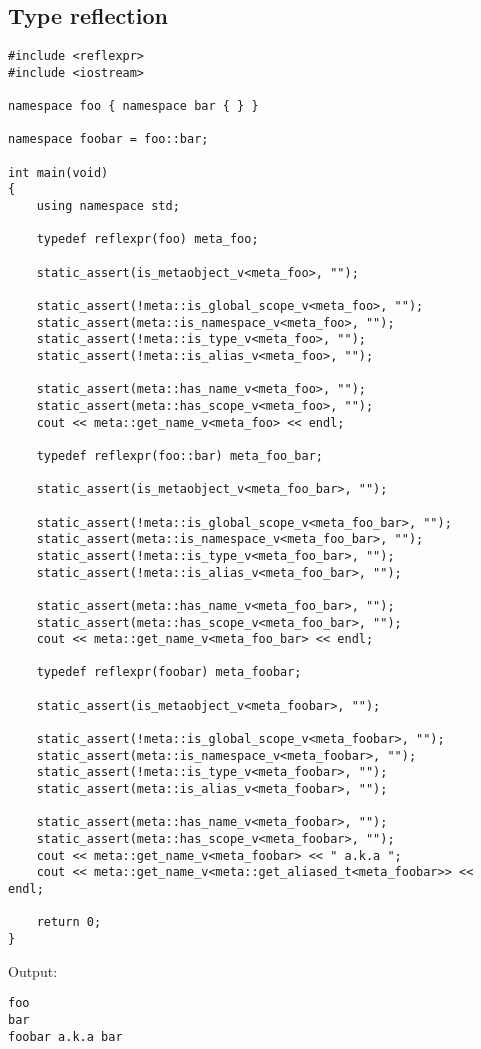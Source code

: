 \subsection{Type reflection}

\begin{verbatim}
#include <reflexpr>
#include <iostream>

namespace foo { namespace bar { } }

namespace foobar = foo::bar;

int main(void)
{
	using namespace std;

	typedef reflexpr(foo) meta_foo;

	static_assert(is_metaobject_v<meta_foo>, "");

	static_assert(!meta::is_global_scope_v<meta_foo>, "");
	static_assert(meta::is_namespace_v<meta_foo>, "");
	static_assert(!meta::is_type_v<meta_foo>, "");
	static_assert(!meta::is_alias_v<meta_foo>, "");

	static_assert(meta::has_name_v<meta_foo>, "");
	static_assert(meta::has_scope_v<meta_foo>, "");
	cout << meta::get_name_v<meta_foo> << endl;

	typedef reflexpr(foo::bar) meta_foo_bar;

	static_assert(is_metaobject_v<meta_foo_bar>, "");

	static_assert(!meta::is_global_scope_v<meta_foo_bar>, "");
	static_assert(meta::is_namespace_v<meta_foo_bar>, "");
	static_assert(!meta::is_type_v<meta_foo_bar>, "");
	static_assert(!meta::is_alias_v<meta_foo_bar>, "");

	static_assert(meta::has_name_v<meta_foo_bar>, "");
	static_assert(meta::has_scope_v<meta_foo_bar>, "");
	cout << meta::get_name_v<meta_foo_bar> << endl;

	typedef reflexpr(foobar) meta_foobar;

	static_assert(is_metaobject_v<meta_foobar>, "");

	static_assert(!meta::is_global_scope_v<meta_foobar>, "");
	static_assert(meta::is_namespace_v<meta_foobar>, "");
	static_assert(!meta::is_type_v<meta_foobar>, "");
	static_assert(meta::is_alias_v<meta_foobar>, "");

	static_assert(meta::has_name_v<meta_foobar>, "");
	static_assert(meta::has_scope_v<meta_foobar>, "");
	cout << meta::get_name_v<meta_foobar> << " a.k.a ";
	cout << meta::get_name_v<meta::get_aliased_t<meta_foobar>> << endl;

	return 0;
}
\end{verbatim}

Output:

\begin{verbatim}
foo
bar
foobar a.k.a bar
\end{verbatim}

